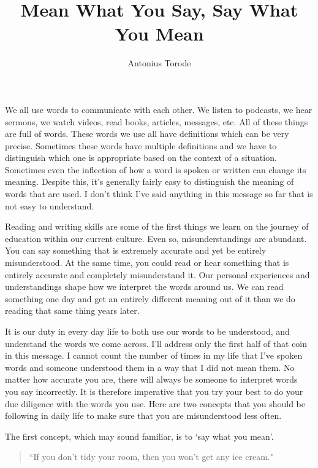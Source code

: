 \documentclass[10pt]{article}
\title{Mean What You Say, Say What You Mean}
\author{Antonius Torode}
\begin{document}
\maketitle
\thispagestyle{fancy}

\begin{multicols}{2}
	
We all use words to communicate with each other. We listen to podcasts, we hear sermons, we watch videos, read books, articles, messages, etc. All of these things are full of words. These words we use all have definitions which can be very precise. Sometimes these words have multiple definitions and we have to distinguish which one is appropriate based on the context of a situation. Sometimes even the inflection of how a word is spoken or written can change its meaning. Despite this, it's generally fairly easy to distinguish the meaning of words that are used. I don't think I've said anything in this message so far that is not easy to understand.

Reading and writing skills are some of the first things we learn on the journey of education within our current culture. Even so, misunderstandings are abundant. You can say something that is extremely accurate and yet be entirely misunderstood. At the same time, you could read or hear something that is entirely accurate and completely misunderstand it. Our personal experiences and understandings shape how we interpret the words around us. We can read something one day and get an entirely different meaning out of it than we do reading that same thing years later.

It is our duty in every day life to both use our words to be understood, and understand the words we come across. I'll address only the first half of that coin in this message. I cannot count the number of times in my life that I've spoken words and someone understood them in a way that I did not mean them. No matter how accurate you are, there will always be someone to interpret words you say incorrectly. It is therefore imperative that you try your best to do your due diligence with the words you use. Here are two concepts that you should be following in daily life to make sure that you are misunderstood less often.

The first concept, which may sound familiar, is to `say what you mean'.

\begin{quotation}
``If you don't tidy your room, then you won't get any ice cream." \cite{Mathematician} 
\end{quotation}


\end{multicols}
\end{document}
